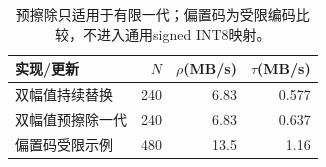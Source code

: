 \begin{table}[htbp]\centering\small
\begin{tabular}{@{}lrrr@{}}\toprule
实现/更新 & $N$ & $\rho$(MB/s) & $\tau$(MB/s)\\\midrule
双幅值持续替换 & 240 & 6.83 & 0.577\\
双幅值预擦除一代 & 240 & 6.83 & 0.637\\
偏置码受限示例 & 480 & 13.5 & 1.16\\
\bottomrule\end{tabular}
\caption{预擦除只适用于有限一代；偏置码为受限编码比较，不进入通用signed INT8映射。}\end{table}
